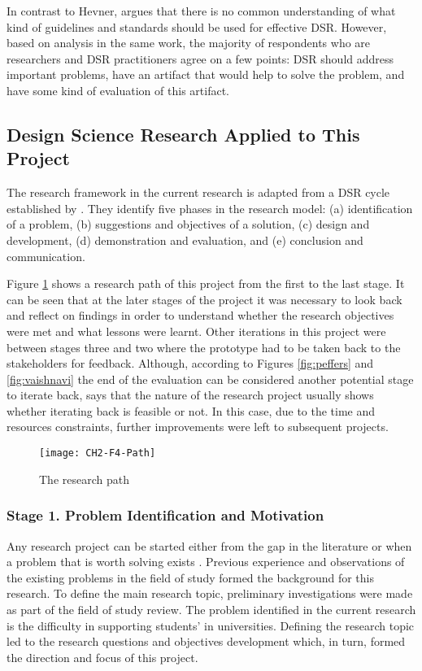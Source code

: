 In contrast to Hevner, \citet{Venable2010} argues that there is no common
understanding of what kind of guidelines and standards should be used for
effective DSR. However, based on analysis in the same work, the majority of
respondents who are researchers and DSR practitioners agree on a few points: DSR
should address important problems, have an artifact that would help to solve the
problem, and have some kind of evaluation of this artifact.

\subsection{Design Science Research Applied to This Project}

The research framework in the current research is adapted from a DSR cycle
established by \citet{Vaishnavi2007}. They identify five phases in the research
model: (a) identification of a problem, (b) suggestions and objectives of a
solution, (c) design and development, (d) demonstration and evaluation, and (e)
conclusion and communication.

Figure \ref{fig:path} shows a research path of this project from the first
to the last stage. It can be seen that at the later stages of the project it was
necessary to look back and reflect on findings in order to understand whether
the research objectives were met and what lessons were learnt. Other iterations
in this project were between stages three and two where the prototype had to be
taken back to the stakeholders for feedback. Although, according to Figures
\ref{fig:peffers} and \ref{fig:vaishnavi} the end of the evaluation can be
considered another potential stage to iterate back, \citet{Peffers2008} says
that the nature of the research project usually shows whether iterating back is
feasible or not. In this case, due to the time and resources constraints,
further improvements were left to subsequent projects.

\begin{figure}[htb]
\centering
\texttt{[image: CH2-F4-Path]}
\caption{The research path}
\label{fig:path}
\end{figure}

\subsubsection{Stage 1. Problem Identification and Motivation}

Any research project can be started either from the gap in the literature or
when a problem that is worth solving exists \citep{Bourner2002}. Previous
experience and observations of the existing problems in the field of study
formed the background for this research. To define the main research topic,
preliminary investigations were made as part of the field of study review. The
problem identified in the current research is the difficulty in supporting
students' \LLLs in universities. Defining the research topic led to the research
questions and objectives development which, in turn, formed the direction and
focus of this project.


